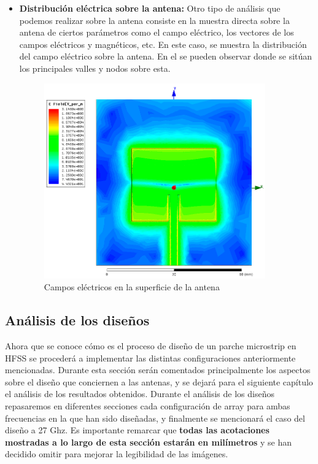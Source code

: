 \begin{itemize}
\item \textbf{Distribución eléctrica sobre la antena: }Otro tipo de análisis que podemos realizar sobre la antena consiste en la muestra directa sobre la antena de ciertos parámetros como el campo eléctrico, los vectores de los campos eléctricos y magnéticos, etc. En este caso, se muestra la distribución del campo eléctrico sobre la antena. En el se pueden observar donde se sitúan los principales valles y nodos sobre esta.
\vfill
	\begin{figure}[H]
    \centering
        \includegraphics[width=0.9\textwidth]{archivos/analisis/1x11/7}
        \caption{Campos eléctricos en la superficie de la antena}
        \label{fig:Complexmage}
	\end{figure}

\end{itemize}

\subsection{Análisis de los diseños}
\label{analdis}
\par Ahora que se conoce cómo es el proceso de diseño de un parche microstrip en HFSS se procederá a implementar las distintas configuraciones anteriormente mencionadas. Durante esta sección serán comentados principalmente los aspectos sobre el diseño que conciernen a las antenas, y se dejará para el siguiente capítulo el análisis de los resultados obtenidos. Durante el análisis de los diseños repasaremos en diferentes secciones cada configuración de array para ambas frecuencias en la que han sido diseñadas, y finalmente se mencionará el caso del diseño a 27 Ghz. Es importante remarcar que \textbf{todas las acotaciones mostradas a lo largo de esta sección estarán en milímetros} y se han decidido omitir para mejorar la legibilidad de las imágenes.

